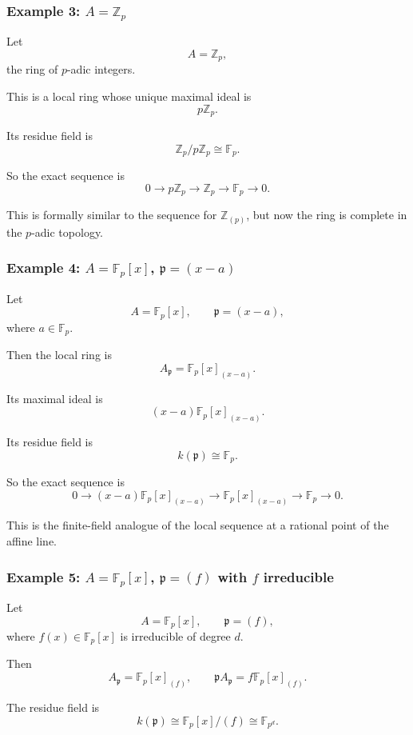 \documentclass[12pt,a4paper]{article}
\theoremstyle{notespace}
\newcommand{\mf}{\mathfrak}
\theoremstyle{definition}
\begin{document}
\subsubsection{Example 3: \(A=\mathbb Z_p\)}

Let
\[
A=\mathbb Z_p,
\]
the ring of \(p\)-adic integers.

This is a local ring whose unique maximal ideal is
\[
p\mathbb Z_p.
\]

Its residue field is
\[
\mathbb Z_p/p\mathbb Z_p\cong \mathbb F_p.
\]

So the exact sequence is
\[
0
\longrightarrow
p\mathbb Z_p
\longrightarrow
\mathbb Z_p
\longrightarrow
\mathbb F_p
\longrightarrow 0.
\]

This is formally similar to the sequence for \(\mathbb Z_{(p)}\), but now the ring is complete in the \(p\)-adic topology.

\subsubsection{Example 4: \(A=\mathbb F_p[x]\), \(\mf p=(x-a)\)}

Let
\[
A=\mathbb F_p[x],
\qquad
\mf p=(x-a),
\]
where \(a\in \mathbb F_p\).

Then the local ring is
\[
A_{\mf p}=\mathbb F_p[x]_{(x-a)}.
\]

Its maximal ideal is
\[
(x-a)\mathbb F_p[x]_{(x-a)}.
\]

Its residue field is
\[
k(\mf p)\cong \mathbb F_p.
\]

So the exact sequence is
\[
0
\longrightarrow
(x-a)\mathbb F_p[x]_{(x-a)}
\longrightarrow
\mathbb F_p[x]_{(x-a)}
\longrightarrow
\mathbb F_p
\longrightarrow 0.
\]

This is the finite-field analogue of the local sequence at a rational point of the affine line.

\subsubsection{Example 5: \(A=\mathbb F_p[x]\), \(\mf p=(f)\) with \(f\) irreducible}

Let
\[
A=\mathbb F_p[x],
\qquad
\mf p=(f),
\]
where \(f(x)\in \mathbb F_p[x]\) is irreducible of degree \(d\).

Then
\[
A_{\mf p}=\mathbb F_p[x]_{(f)},
\qquad
\mf p A_{\mf p}=f\mathbb F_p[x]_{(f)}.
\]

The residue field is
\[
k(\mf p)\cong \mathbb F_p[x]/(f)\cong \mathbb F_{p^d}.
\]
\end{document}
